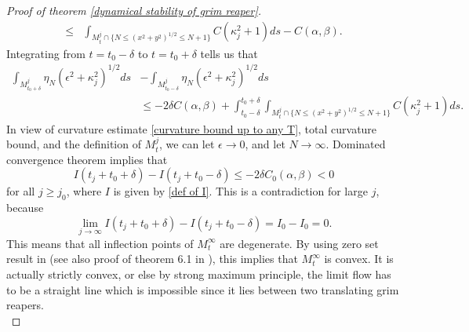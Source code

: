 \documentclass[pdflatex,sn-mathphys-num]{sn-jnl}%
\begin{document}
\begin{proof}[Proof of theorem \ref{dynamical stability of grim reaper}]
\begin{align*}
 \leq & \int_{M^j_t \cap \{N \leq (x^2 + y^2)^{1/2} \leq N+1 \}}C(\kappa_j^2 +1)ds - C(\alpha, \beta).
\end{align*}
Integrating from $t = t_0 -\delta$ to $t = t_0 + \delta$ tells us that 
\begin{align*}
     \int_{M^j_{t_0 + \delta}}\eta_N(\epsilon^2 + \kappa_j^2)^{1/2}ds&  - \int_{M^j_{t_0 - \delta}}\eta_N(\epsilon^2 + \kappa_j^2)^{1/2}ds \\ &\leq -2\delta C(\alpha, \beta) + \int_{t_0 - \delta}^{t_0 + \delta}\int_{M^j_t \cap \{N \leq (x^2 + y^2)^{1/2} \leq N+1 \}}C(\kappa_j^2 +1)ds.
\end{align*}
In view of curvature estimate \eqref{curvature bound up to any T}, total curvature bound, and the definition of $M^j_t$, we can let $\epsilon \to 0$, and let $N \to \infty$. Dominated convergence theorem implies that
\begin{equation}
    I(t_j + t_0 + \delta) - I(t_j + t_0 - \delta) \leq -2\delta C_0(\alpha, \beta) < 0
\end{equation}
for all $j \geq j_0$, where $I$ is given by \eqref{def of I}. This is a contradiction for large $j$, because
\begin{equation}
   \lim_{j \to \infty}I(t_j + t_0 + \delta) - I(t_j + t_0 - \delta) = I_0 - I_0 = 0. 
\end{equation}
This means that all inflection points of $M^{\infty}_t$ are degenerate. By using zero set result in \cite{zeroset} (see also proof of theorem 6.1 in \cite{Haslhofer2016LECTURESOC}), this implies that $M^{\infty}_t$ is convex. It is actually strictly convex, or else by strong maximum principle, the limit flow has to be a straight line which is impossible since it lies between two translating grim reapers. \\


\end{proof}
\end{document}
